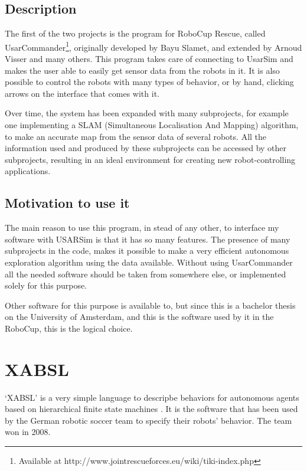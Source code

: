 \documentclass[a4paper,10pt]{article}
\begin{document}
\begin{multicols}{2}
\subsection{Description}
The first of the two projects is the program for RoboCup Rescue, called
UsarCommander\footnote{Available at
http://www.jointrescueforces.eu/wiki/tiki-index.php}, originally developed by Bayu Slamet, and extended by Arnoud
Visser and many others. This program takes care of connecting to UsarSim and
makes the user able to easily get sensor data from the robots in it. It is also
possible to control the robots with many types of behavior, or by hand, clicking
arrows on the interface that comes with it.

Over time, the system has been expanded with many subprojects, for example one
implementing a SLAM
(Simultaneous Localisation And Mapping) algorithm, to make an accurate map from
the sensor data of several robots.\cite{slamet2006manifoldslam} All the information used and produced by
these subprojects can be accessed by other subprojects, resulting in an ideal
environment for creating new robot-controlling applications.

\subsection{Motivation to use it}
The main reason to use this program, in stead of any other, to interface my
software with USARSim is that it has so many features. The presence of many
subprojects in the code, makes it possible to make a very efficient autonomous
exploration algorithm using the data available. Without using UsarCommander all
the needed software should be taken from somewhere else, or implemented solely
for this purpose.

Other software for this purpose is available to, but since this is a bachelor
thesis on the University of Amsterdam, and this is the software used by it in
the RoboCup, this is the logical choice.

\section{XABSL}
`XABSL' is a very simple language to descripbe behaviors for autonomous agents
based on hierarchical finite state machines \cite{loetzsch2003xabsl}. It is the
software that has been used by the German robotic soccer team to specify their
robots' behavior. The team won in 2008.


\end{multicols}
\end{document}
